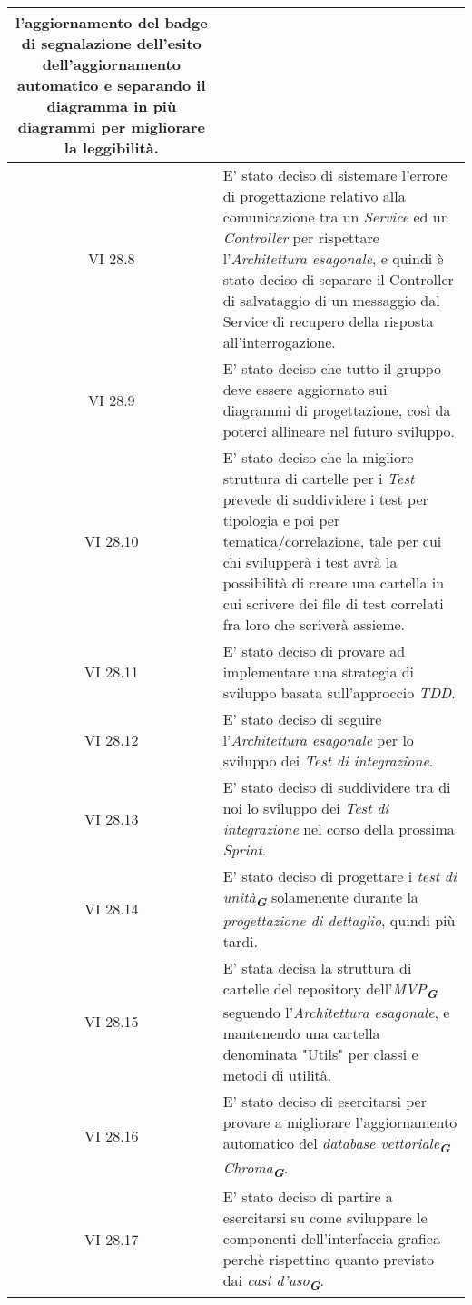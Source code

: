 \begin{table}[htbp]
\begin{tabular}{|c|p{}|}
        l'aggiornamento del badge di segnalazione dell'esito dell'aggiornamento automatico e separando il diagramma in più diagrammi
        per migliorare la leggibilità.\\
        \hline
        VI 28.8 & E' stato deciso di sistemare l'errore di progettazione relativo alla comunicazione tra un \emph{Service} ed un
        \emph{Controller} per rispettare l'\emph{Architettura esagonale}, e quindi è stato deciso di separare il Controller di 
        salvataggio di un messaggio dal Service di recupero della risposta all'interrogazione.\\
        \hline
        VI 28.9 & E' stato deciso che tutto il gruppo deve essere aggiornato sui diagrammi di progettazione, così da poterci allineare
        nel futuro sviluppo.\\
        \hline
        VI 28.10 & E' stato deciso che la migliore struttura di cartelle per i \emph{Test} prevede di suddividere i test per tipologia
        e poi per tematica/correlazione, tale per cui chi svilupperà i test avrà la possibilità di creare una cartella in cui scrivere
        dei file di test correlati fra loro che scriverà assieme.\\
        \hline
        VI 28.11 & E' stato deciso di provare ad implementare una strategia di sviluppo basata sull'approccio \emph{TDD}.\\
        \hline
        VI 28.12 & E' stato deciso di seguire l'\emph{Architettura esagonale} per lo sviluppo dei \emph{Test di integrazione}.\\
        \hline
        VI 28.13 & E' stato deciso di suddividere tra di noi lo sviluppo dei \emph{Test di integrazione} nel corso della prossima
        \emph{Sprint}.\\
        \hline
        VI 28.14 & E' stato deciso di progettare i \emph{test di unità}\textsubscript{\textit{\textbf{G}}} solamenente durante la
        \emph{progettazione di dettaglio}, quindi più tardi.\\
        \hline
        VI 28.15 & E' stata decisa la struttura di cartelle del repository dell'\emph{MVP}\textsubscript{\textit{\textbf{G}}} seguendo
        l'\emph{Architettura esagonale}, e mantenendo una cartella denominata "Utils" per classi e metodi di utilità.\\
        \hline
        VI 28.16 & E' stato deciso di esercitarsi per provare a migliorare l’aggiornamento automatico del
        \emph{database vettoriale}\textsubscript{\textit{\textbf{G}}} \emph{Chroma}\textsubscript{\textit{\textbf{G}}}.\\
        \hline
        VI 28.17 & E' stato deciso di partire a esercitarsi su come sviluppare le componenti dell'interfaccia grafica perchè 
        rispettino quanto previsto dai \emph{casi d'uso}\textsubscript{\textit{\textbf{G}}}.\\
        \hline
    \end{tabular}
\end{table}


